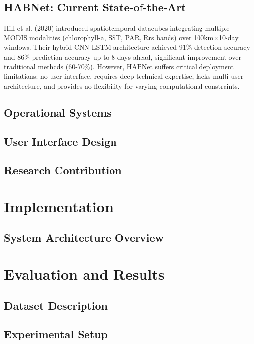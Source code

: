 \documentclass[conference]{IEEEtran}
\begin{document}
\subsection{HABNet: Current State-of-the-Art}
Hill et al. (2020) introduced spatiotemporal datacubes integrating multiple MODIS modalities (chlorophyll-a, SST, PAR, Rrs bands) over 100km×10-day windows. Their hybrid CNN-LSTM architecture achieved 91\% detection accuracy and 86\% prediction accuracy up to 8 days ahead, significant improvement over traditional methods (60-70\%). However, HABNet suffers critical deployment limitations: no user interface, requires deep technical expertise, lacks multi-user architecture, and provides no flexibility for varying computational constraints.
\subsection{Operational Systems}

\subsection{User Interface Design}

\subsection{Research Contribution}

\section{Implementation}

\subsection{System Architecture Overview}


\section{Evaluation and Results}

\subsection{Dataset Description}

\subsection{Experimental Setup}
\end{document}

